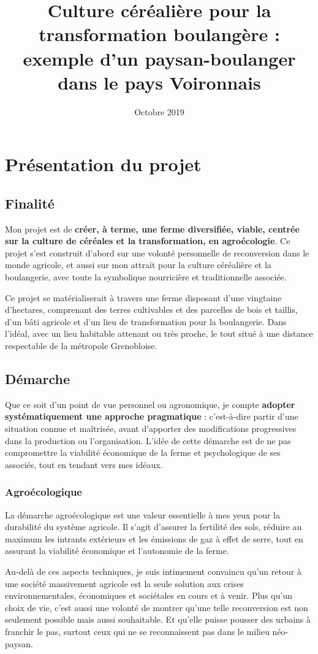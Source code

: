 \documentclass{article}
\title{Culture céréalière pour la transformation boulangère : exemple d'un paysan-boulanger dans le pays Voironnais}
\date{Octobre 2019}
\begin{document}
\section{Présentation du projet}

\subsection{Finalité}

Mon projet est de \textbf{créer, à terme, une ferme diversifiée, viable, centrée sur la culture de céréales et la transformation, en agroécologie}. Ce projet s'est construit d'abord sur une volonté personnelle de reconversion dans le monde agricole, et aussi sur mon attrait pour la culture céréalière et la boulangerie, avec toute la symbolique nourricière et traditionnelle associée. 

Ce projet se matérialiserait à travers une ferme disposant d'une vingtaine d'hectares, comprenant des terres cultivables et des parcelles de bois et taillis, d'un bâti agricole et d'un lieu de transformation pour la boulangerie. Dans l'idéal, avec un lieu habitable attenant ou très proche, le tout situé à une distance respectable de la métropole Grenobloise. 

\subsection{Démarche}

Que ce soit d'un point de vue personnel ou agronomique, je compte \textbf{adopter systématiquement une approche pragmatique} : c'est-à-dire partir d'une situation connue et maîtrisée, avant d'apporter des modifications progressives dans la production ou l'organisation. L'idée de cette démarche est de ne pas compromettre la viabilité économique de la ferme et psychologique de ses associés, tout en tendant vers mes idéaux.

\subsubsection*{Agroécologique}

La démarche agroécologique est une valeur essentielle à mes yeux pour la durabilité du système agricole. Il s'agit d'assurer la fertilité des sols, réduire au maximum les intrants extérieurs et les émissions de gaz à effet de serre, tout en assurant la viabilité économique et l'autonomie de la ferme. 

Au-delà de ces aspects techniques, je suis intimement convaincu qu'un retour à une société massivement agricole est la seule solution aux crises environnementales, économiques et sociétales en cours et à venir. Plus qu'un choix de vie, c'est aussi une volonté de montrer qu'une telle reconversion est non seulement possible mais aussi souhaitable. Et qu'elle puisse pousser des urbains à franchir le pas, surtout ceux qui ne se reconnaissent pas dans le milieu néo-paysan.
\end{document}
